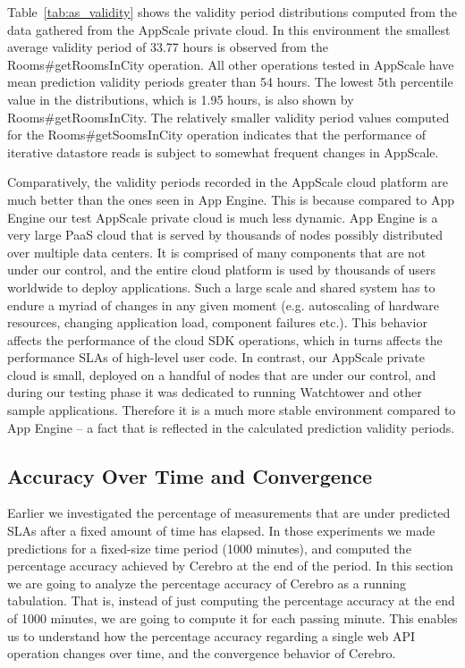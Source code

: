 Table~\ref{tab:as_validity} shows the validity period distributions computed from the data gathered from
the AppScale private cloud. In this environment the smallest average validity period of 33.77 hours is observed from the
Rooms\#getRoomsInCity operation. All other operations tested in AppScale have mean prediction validity periods greater
than 54 hours. The lowest 5th percentile value in the distributions, which is 1.95 hours, is also shown by Rooms\#getRoomsInCity.
The relatively smaller validity period values computed for the
Rooms\#getSoomsInCity operation indicates that the performance of iterative datastore reads is subject to somewhat frequent changes 
in AppScale.

Comparatively, the validity periods recorded in the AppScale
cloud platform are much better than the ones seen in App Engine. This is because compared to App Engine our
test AppScale private cloud is much less dynamic. App Engine is a very large PaaS cloud that is served by thousands of
nodes possibly distributed over multiple data centers. It is comprised of many components that are not under our control,
and the entire cloud platform is used by thousands of users worldwide to deploy applications. Such a large scale and
shared system has to endure a myriad of changes in any given moment (e.g. autoscaling of hardware resources, 
changing application load, component failures etc.). This behavior affects the performance of the cloud SDK operations, which
in turns affects the performance SLAs of high-level user code. In contrast, our AppScale
private cloud is small, deployed on a handful of nodes that are under our control, and during our testing phase it was dedicated
to running Watchtower and other sample applications. Therefore it is a much more stable environment compared to 
App Engine -- a fact that is reflected in the calculated prediction validity periods.

\subsection{Accuracy Over Time and Convergence}
Earlier we investigated the percentage of measurements that are under predicted SLAs 
after a fixed amount of time has elapsed.
In those experiments we made predictions for a fixed-size time period (1000 minutes), 
and computed the percentage accuracy achieved by Cerebro at the end of the period.
In this section we are going to analyze the percentage accuracy of Cerebro as a running tabulation. That is, instead of just
computing the percentage accuracy at the end of 1000 minutes, we are going to compute it for each passing minute. This enables us to
understand how the percentage accuracy regarding a single web API operation changes over time, and the convergence
behavior of Cerebro.

